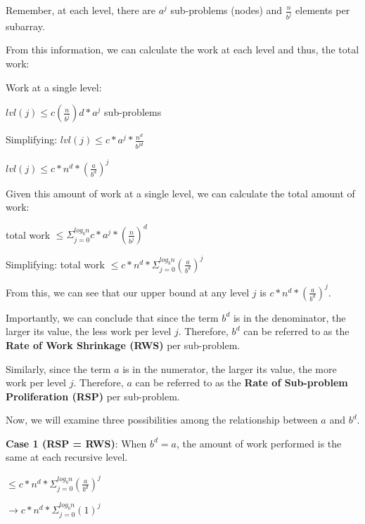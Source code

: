 \documentclass[11pt]{article}
\begin{document}
Remember, at each level, there are $a^j$ sub-problems (nodes) and $\frac{n}{b^j}$ elements per subarray.

From this information, we can calculate the work at each level and thus, the total work:

Work at a single level:
\vspace{11pt}
\begin{center}
    $lvl(j)\leq c(\frac{n}{b^j})d*a^j$ sub-problems

    Simplifying: $lvl(j) \leq c*a^j*\frac{n^d}{b^{jd}}$

    $lvl(j) \leq c*n^d*(\frac{a}{b^d})^j$
\end{center}
\vspace{11pt}

Given this amount of work at a single level, we can calculate the total amount of work:

\vspace{11pt}
\begin{center}
    total work $\leq \Sigma_{j=0}^{log_bn}c*a^j*(\frac{n}{b^j})^d$

    Simplifying: total work $\leq c*n^d *\Sigma_{j=0}^{log_bn}(\frac{a}{b^d})^j$
\end{center}
\vspace{11pt}

From this, we can see that our upper bound at any level $j$ is $c*n^d*(\frac{a}{b^d})^j$.

Importantly, we can conclude that since the term $b^d$ is in the denominator, the larger its value, the less work per level $j$. Therefore, $b^d$ can be referred to as the \textbf{Rate of Work Shrinkage (RWS)} per sub-problem.

Similarly, since the term $a$ is in the numerator, the larger its value, the more work per level $j$. Therefore, $a$ can be referred to as the \textbf{Rate of Sub-problem Proliferation (RSP)} per sub-problem. 

Now, we will examine three possibilities among the relationship between $a$ and $b^d$.

\vspace{11pt}
\textbf{Case 1 (RSP = RWS)}: When $b^d=a$, the amount of work performed is the same at each recursive level.

\vspace{11pt}
\begin{center}
    $\leq c*n^d *\Sigma_{j=0}^{log_bn}(\frac{a}{b^d})^j$

    $\to c*n^d *\Sigma_{j=0}^{log_bn}(1)^j$
\end{center}
\vspace{11pt}
\end{document}
